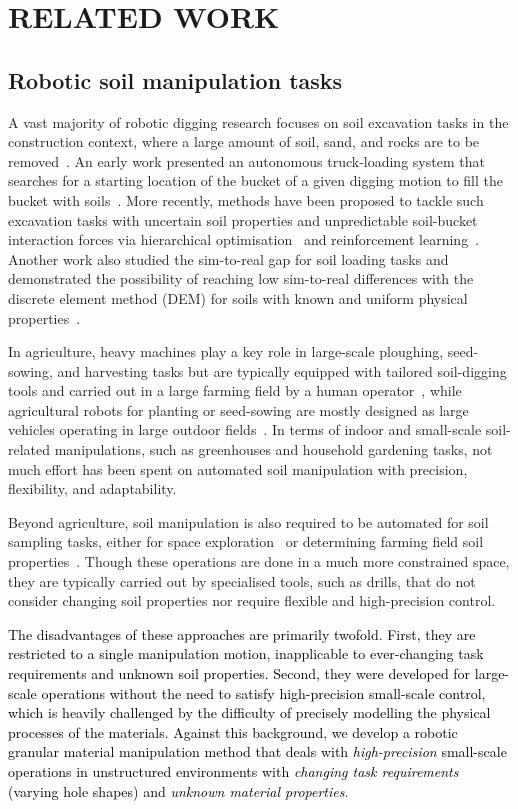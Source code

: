 \documentclass[letterpaper, 10 pt, journal, twoside]{ieeetran}
\newcommand{\rp}[1]{\textcolor{black}{#1}}
\begin{document}
\section{RELATED WORK}\label{sec:rw}
\subsection{Robotic soil manipulation tasks}
A vast majority of robotic digging research focuses on soil excavation tasks in the construction context, where a large amount of soil, sand, and rocks are to be removed~\cite{stentz1999robotic,jud2017planning,egli2022soil,aoshima2024examining}. An early work presented an autonomous truck-loading system that searches for a starting location of the bucket of a given digging motion to fill the bucket with soils~\cite{stentz1999robotic}. More recently, methods have been proposed to tackle such excavation tasks with uncertain soil properties and unpredictable soil-bucket interaction forces via hierarchical optimisation~\cite{jud2017planning} and reinforcement learning~\cite{egli2022soil}. Another work also studied the sim-to-real gap for soil loading tasks and demonstrated the possibility of reaching low sim-to-real differences with the discrete element method (DEM) for soils with known and uniform physical properties~\cite{aoshima2024examining}.

In agriculture, heavy machines play a key role in large-scale ploughing, seed-sowing, and harvesting tasks but are typically equipped with tailored soil-digging tools and carried out in a large farming field by a human operator~\cite{rondelli2022review}, while agricultural robots for planting or seed-sowing are mostly designed as large vehicles operating in large outdoor fields~\cite{aravind2017task,agriengineering6030166}. In terms of indoor and small-scale soil-related manipulations, such as greenhouses and household gardening tasks, not much effort has been spent on automated soil manipulation with precision, flexibility, and adaptability.

Beyond agriculture, soil manipulation is also required to be automated for soil sampling tasks, either for space exploration~\cite{wang2024advances} or determining farming field soil properties~\cite{joe2024soilsampling}. Though these operations are done in a much more constrained space, they are typically carried out by specialised tools, such as drills, that do not consider changing soil properties nor require flexible and high-precision control.

\rp{The disadvantages of these approaches are primarily twofold. First, they are restricted to a single manipulation motion, inapplicable to ever-changing task requirements and unknown soil properties. Second, they were developed for large-scale operations without the need to satisfy high-precision small-scale control, which is heavily challenged by the difficulty of precisely modelling the physical processes of the materials.
Against this background, we develop a robotic granular material manipulation method that deals with \textit{high-precision} small-scale operations in unstructured environments with \textit{changing task requirements} (varying hole shapes) and \textit{unknown material properties}}.
\end{document}
